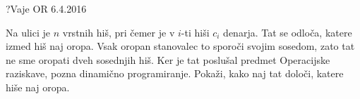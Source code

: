 \begin{naloga}{?}{Vaje OR 6.4.2016}
\begin{vprasanje}
Na ulici je $n$ vrstnih hiš,
pri čemer je v $i$-ti hiši $c_i$ denarja.
Tat se odloča, katere izmed hiš naj oropa.
Vsak oropan stanovalec to sporoči svojim sosedom,
zato tat ne sme oropati dveh sosednjih hiš.
Ker je tat poslušal predmet Operacijske raziskave,
pozna dinamično programiranje.
Pokaži, kako naj tat določi, katere hiše naj oropa.

\end{vprasanje}
\begin{odgovor}
\end{odgovor}
\end{naloga}
